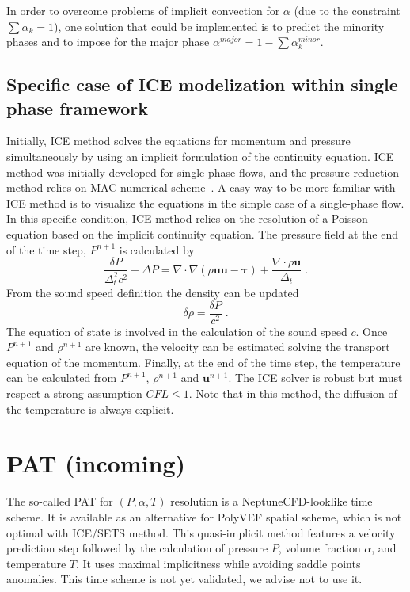 In order to overcome problems of implicit convection for $\alpha$ (due to the constraint $\sum \alpha_k =1$), one solution that could be implemented is to predict the minority phases and to impose for the major phase $\alpha^{major}=1-\sum \alpha_k^{minor}$.

\subsection{Specific case of ICE modelization within single phase framework}

Initially, ICE method solves the equations for momentum and pressure simultaneously by using an implicit formulation of the continuity equation. ICE method was initially developed for single-phase flows, and the pressure reduction method relies on MAC numerical scheme~\cite{harlow1965numerical}. 
A easy way to be more familiar with ICE method is to visualize the equations in the simple case of a single-phase flow. In this specific condition, ICE method relies on the resolution of a Poisson equation based on the implicit continuity equation. The pressure field at the end of the time step, $P^{n+1}$ is calculated by  
\begin{equation}
    \label{eq:poisson_ICE}
    \frac{\delta P}{\Delta_t^2 c^2} - \Delta P = \nabla  \cdot \nabla \left( \rho \mathbf{u u} - \mathbf{\tau}\right) + \frac{\nabla  \cdot \rho \mathbf{u}}{\Delta_t} \; .
\end{equation}
From the sound speed definition the density can be updated
\begin{equation}
    \label{eq:density_update_ICE}
    \delta \rho = \frac{\delta P}{c^2}  \; .
\end{equation}
The equation of state is involved in the calculation of the sound speed $c$. Once $P^{n+1}$ and $\rho^{n+1}$ are known, the velocity can be estimated solving the transport equation of the momentum. Finally, at the end of the time step, the temperature can be calculated from $P^{n+1}$, $\rho^{n+1}$ and $\mathbf{u}^{n+1}$.
The ICE solver is robust but must respect a strong assumption $CFL\leq 1$. Note that in this method, the diffusion of the temperature is always explicit.

\section{PAT (incoming)} \label{time:pat}
The so-called PAT for $(P,\alpha, T)$ resolution is a NeptuneCFD-looklike time scheme. It is available as an alternative for PolyVEF spatial scheme, which is not optimal with ICE/SETS method. This quasi-implicit method features a velocity prediction step followed by the calculation of pressure $P$, volume fraction $\alpha$, and temperature $T$. It uses maximal implicitness while avoiding saddle points anomalies. This time scheme is not yet validated, we advise not to use it. 


